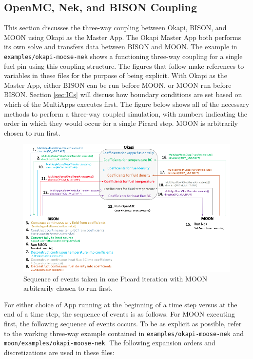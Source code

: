 \documentclass[10pt]{article}
\numberwithin{equation}{section} %
\begin{document}
\subsection{OpenMC, Nek, and BISON Coupling}
\label{sec:ONB}
This section discusses the three-way coupling between Okapi, BISON, and MOON using Okapi as the Master App. The Okapi Master App both performs its own solve and transfers data between BISON and MOON. The example in {\tt examples/okapi-moose-nek} shows a functioning three-way coupling for a single fuel pin using this coupling structure. The figures that follow make references to variables in these files for the purpose of being explicit. With Okapi as the Master App, either BISON can be run before MOON, or MOON run before BISON. Section \ref{sec:ICs} will discuss how boundary conditions are set based on which of the MultiApps executes first. The figure below shows all of the necessary methods to perform a three-way coupled simulation, with numbers indicating the order in which they would occur for a single Picard step. MOON is arbitrarily chosen to run first.

\begin{figure}[H]
\centering
\includegraphics[width=17.5cm]{figures/OpenMC-BISON-Nek-complicated.png}
\caption{Sequence of events taken in one Picard iteration with MOON arbitrarily chosen to run first.}
\end{figure}

For either choice of App running at the beginning of a time step versus at the end of a time step, the sequence of events is as follows. For MOON executing first, the following sequence of events occurs. To be as explicit as possible, refer to the working three-way example contained in {\tt examples/okapi-moose-nek} and {\tt moon/examples/okapi-moose-nek}. The following expansion orders and discretizations are used in these files:
\end{document}
